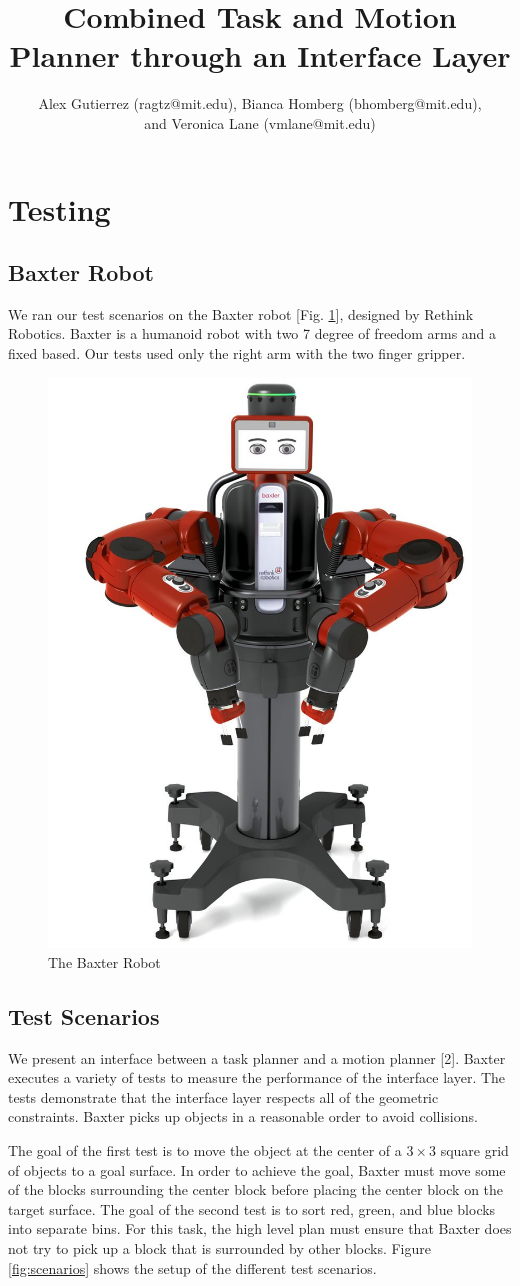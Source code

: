 \documentclass[12pt]{article}
\title{Combined Task and Motion Planner through an Interface Layer}
\author{Alex Gutierrez (ragtz@mit.edu), Bianca Homberg (bhomberg@mit.edu), \\and Veronica Lane (vmlane@mit.edu)}
\begin{document}
\maketitle 


\section{Testing}

\subsection{Baxter Robot}

We ran our test scenarios on the Baxter robot [Fig. \ref{fig:baxter}], designed by Rethink Robotics. 
Baxter is a humanoid robot with two 7 degree of freedom arms and a fixed based. 
Our tests used only the right arm with the two finger gripper.

\begin{figure}[h]
\centering
\includegraphics[width=.2\textwidth]{baxter}
\caption{The Baxter Robot \label{fig:baxter}}
\end{figure}

\subsection{Test Scenarios} \label{tests}

We present an interface between a task planner and a motion planner [2]. 
Baxter executes a variety of tests to measure the performance of the interface layer. 
The tests demonstrate that the interface layer respects all of the geometric constraints. 
Baxter picks up objects in a reasonable order to avoid collisions.

The goal of the first test is to move the object at the center of a $3\times3$ square grid of objects to a goal surface. 
In order to achieve the goal, Baxter must move some of the blocks surrounding the center block before placing the center block on the target surface.
The goal of the second test is to sort red, green, and blue blocks into separate bins.
For this task, the high level plan must ensure that Baxter does not try to pick up a block that is surrounded by other blocks.
Figure \ref{fig:scenarios} shows the setup of the different test scenarios. 
\end{document}
